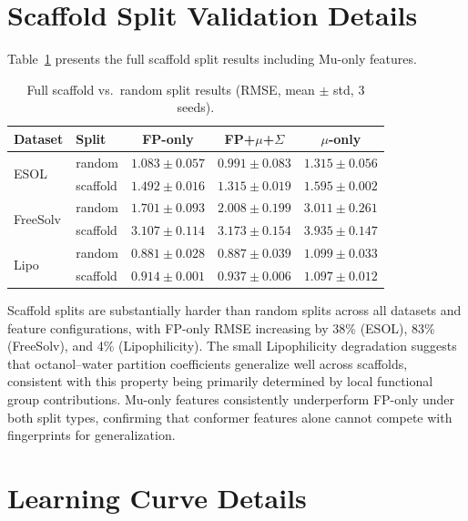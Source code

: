\documentclass[sigconf]{acmart}
\begin{document}
\section{Scaffold Split Validation Details}
\label{app:scaffold}

Table~\ref{tab:scaffold_full} presents the full scaffold split results including Mu-only features.

\begin{table}[ht]
\caption{Full scaffold vs.\ random split results (RMSE, mean $\pm$ std, 3 seeds).}
\label{tab:scaffold_full}
\centering
\small
\begin{tabular}{@{}llccc@{}}
\toprule
Dataset & Split & FP-only & FP+$\mu$+$\Sigma$ & $\mu$-only \\
\midrule
\multirow{2}{*}{ESOL} & random & $1.083{\pm}0.057$ & $0.991{\pm}0.083$ & $1.315{\pm}0.056$ \\
                       & scaffold & $1.492{\pm}0.016$ & $1.315{\pm}0.019$ & $1.595{\pm}0.002$ \\
\midrule
\multirow{2}{*}{FreeSolv} & random & $1.701{\pm}0.093$ & $2.008{\pm}0.199$ & $3.011{\pm}0.261$ \\
                            & scaffold & $3.107{\pm}0.114$ & $3.173{\pm}0.154$ & $3.935{\pm}0.147$ \\
\midrule
\multirow{2}{*}{Lipo} & random & $0.881{\pm}0.028$ & $0.887{\pm}0.039$ & $1.099{\pm}0.033$ \\
                       & scaffold & $0.914{\pm}0.001$ & $0.937{\pm}0.006$ & $1.097{\pm}0.012$ \\
\bottomrule
\end{tabular}
\end{table}

Scaffold splits are substantially harder than random splits across all datasets and feature configurations, with FP-only RMSE increasing by 38\% (ESOL), 83\% (FreeSolv), and 4\% (Lipophilicity). The small Lipophilicity degradation suggests that octanol--water partition coefficients generalize well across scaffolds, consistent with this property being primarily determined by local functional group contributions. Mu-only features consistently underperform FP-only under both split types, confirming that conformer features alone cannot compete with fingerprints for generalization.

\section{Learning Curve Details}
\label{app:learning}
\end{document}
